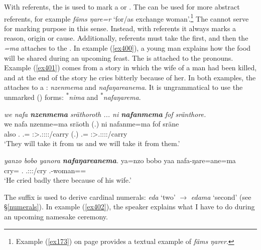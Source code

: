 With  referents, the  is used to mark a  or . The   can be used for more abstract  referents, for example \emph{fäms ŋare=r} `for/as exchange woman'.\footnote{Example (\ref{ex173}) on page \pageref{ex173} provides a textual example of \emph{fäms ŋarer}.} The   cannot serve for marking purpose in this sense. Instead, with  referents it always marks a reason, origin or cause. Additionally,  referents must take the   first, and then the  \emph{=ma} attaches to the . In example (\ref{ex400}), a young man explains how the food will be shared during an upcoming feast. The  is attached to the  pronouns. Example (\ref{ex401}) comes from a story in which the wife of a man had been killed, and at the end of the story he cries bitterly because of her. In both examples, the   attaches to a : \emph{nzenmema} and \emph{nafaŋareanema}. It is ungrammatical to use the unmarked () forms: \textsuperscript{$\ast$}\emph{nima} and \textsuperscript{$\ast$}\emph{nafaŋarema}.

\begin{exe}
	\ex \emph{we nafa \textbf{nzenmema} sräthoroth ... ni \textbf{nafanmema} fof sränthore.}\\
	\gll we nafa nzenme=ma sräoth (.) ni nafanme=ma fof sräne\\
	also \Tnsg.\Erg{} \Fnsg.\Poss=\Char{} \Stpl:\Sbj>\Tsg.\Masc:\Obj:\Irr:\Pfv:\Andat/carry (.) \Fnsg{} \Tnsg.\Poss=\Char{} \Emph{} \Fpl:\Sbj>\Tsg.\Masc:\Obj:\Irr:\Pfv:\Venit/carry\\
	\trans `They will take it from us and we will take it from them.'\\
	\label{ex400}
\end{exe}
\begin{exe}
	\ex \emph{yanzo bobo yanora \textbf{nafaŋareanema}.}
	\gll ya=nzo bobo yaa nafa-ŋare=ane=ma\\
	cry=\Only{} \Med.\All{} \Tsg.\Masc:\Sbj:\Pst:\Ipfv/cry \Third.\Poss-woman=\Poss=\Char\\
	\trans `He cried badly there because of his wife.'
	\label{ex401}
\end{exe}

The  suffix is used to derive cardinal numerals: \emph{eda} `two' $\rightarrow$ \emph{edama} `second' (see \S\ref{numerals}). In example (\ref{ex402}), the speaker explains what I have to do during an upcoming namesake ceremony.

